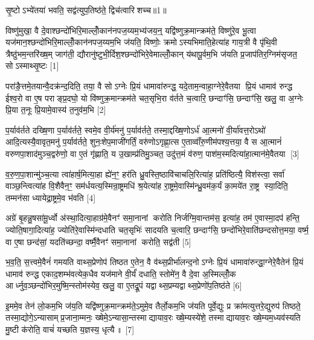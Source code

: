 {\scriptsize {सृ॒ष्टोऽभ्ये॑तया॑ भवति॒ सद्व॑त्युप॒तिष्ठ॑ते॒ द्विच॑त्वारिशच्च॥1॥}}

विष्णु॑मुखा॒ वै दे॒वाश्छन्दो॑भिरि॒माल्लोँ॒कान॑नपज॒य्यम॒भ्य॑जय॒न्॒ यद्वि॑ष्णुक्र॒मान्क्रम॑ते॒ विष्णु॑रे॒व भू॒त्वा यज॑मान॒श्छन्दो॑भिरि॒माल्लोँ॒कान॑नपज॒य्यम॒भि ज॑यति॒ विष्णोः॒ क्रमोऽस्यभिमाति॒हेत्या॑ह गाय॒त्री वै पृ॑थि॒वी त्रैष्ठु॑भम॒न्तरि॑ख्ष॒म् जाग॑ती॒ द्यौरानु॑ष्टुभी॒र्दिश॒श्छन्दो॑भिरे॒वेमाल्लोँ॒कान् य॑थापू॒र्वम॒भि ज॑यति प्र॒जाप॑तिर॒ग्निम॑सृजत॒ सोऽस्माथ्सृ॒ष्टः [1]

परा॑ङै॒त्तमे॒तयान्वै॒दक्र॑न्द॒दिति॒ तया॒ वै सोऽग्नेः प्रि॒यं धामावा॑रुन्द्ध॒ यदे॒ताम॒न्वाहा॒ग्नेरे॒वैतया प्रि॒यं धामाव॑ रुन्द्ध ईश्व॒रो वा ए॒ष पराङ्प्र॒दघो॒ यो वि॑ष्णुक्र॒मान्क्रम॑ते चत॒सृभि॒रा व॑र्तते च॒त्वारि॒ छन्दाꣳ॑सि॒ छन्दाꣳ॑सि॒ खलु॒ वा अ॒ग्नेः प्रि॒या त॒नूः प्रि॒यामे॒वास्य॑ त॒नुव॑म॒भि [2]

प॒र्याव॑र्तते दख्षि॒णा प॒र्याव॑र्तते॒ स्वमे॒व वी॒र्य॑मनु॑ प॒र्याव॑र्तते॒ तस्मा॒द्दख्षि॒णोऽर्ध॑ आ॒त्मनो॑ वी॒र्या॑वत्त॒रोऽथो॑ आदि॒त्यस्यै॒वावृत॒मनु॑ प॒र्याव॑र्तते॒ शुनः॒शेप॒माजी॑गर्तिं॒ वरु॑णोऽगृह्णा॒त्स ए॒ताव्वाँ॑रु॒णीम॑पश्य॒त्तया॒ वै स आ॒त्मानं॑ वरुणपा॒शाद॑मुञ्च॒द्वरु॑णो॒ वा ए॒तं गृ॑ह्णाति॒ य उ॒खाम्प्र॑तिमु॒ञ्चत॒ उदु॑त्त॒मं व॑रुण॒ पाश॑म॒स्मदित्या॑हा॒त्मान॑मे॒वैतया [3]

व॒रु॒ण॒पा॒शान्मु॑ञ्च॒त्या त्वा॑हार्\mbox{}ष॒मित्या॒हा ह्ये॑न॒ꣳ॒ हर॑ति ध्रु॒वस्ति॒ष्ठावि॑चाचलि॒रित्या॑ह॒ प्रति॑ष्ठित्यै॒ विश॑स्त्वा॒ सर्वा॑ वाञ्छ॒न्त्वित्या॑ह वि॒शैवैन॒ꣳ॒ सम॑र्धयत्य॒स्मिन्रा॒ष्ट्रमधि॑ श्र॒येत्या॑ह रा॒ष्ट्रमे॒वास्मि॑न्ध्रु॒वम॑क॒र्यं का॒मये॑त रा॒ष्ट्र स्या॒दिति॒ तम्मन॑सा ध्यायेद्रा॒ष्ट्रमे॒व भ॑वति [4]

अग्रे॑ बृ॒हन्नु॒षसा॑मू॒र्ध्वो अ॑स्था॒दित्या॒हाग्र॑मे॒वैनꣳ॑ समा॒नानां करोति निर्जग्मि॒वान्तम॑स॒ इत्या॑ह॒ तम॑ ए॒वास्मा॒दप॑ हन्ति॒ ज्योति॒षागा॒दित्या॑ह॒ ज्योति॑रे॒वास्मि॑न्दधाति चत॒सृभिः॑ सादयति च॒त्वारि॒ छन्दाꣳ॑सि॒ छन्दो॑भिरे॒वाति॑छन्दसोत्त॒मया॒ वर्ष्म॒ वा ए॒षा छन्द॑सां॒ यदति॑च्छन्दा॒ वर्ष्मै॒वैनꣳ॑ समा॒नानां करोति॒ सद्व॑ती [5]

भ॒व॒ति॒ स॒त्त्वमे॒वैनं॑ गमयति वाथ्स॒प्रेणोप॑ तिष्ठत ए॒तेन॒ वै व॑थ्स॒प्रीर्भा॑लन्द॒नोऽग्नेः प्रि॒यं धामावा॑रुन्द्धा॒ग्नेरे॒वैतेन॑ प्रि॒यं धामाव॑ रुन्द्ध एकाद॒शम्भ॑वत्येक॒धैव यज॑माने वी॒र्यं॑ दधाति॒ स्तोमे॑न॒ वै दे॒वा अ॒स्मिल्लोँ॒क आर्ध्नुव॒ञ्छन्दो॑भिर॒मुष्मि॒न्स्तोम॑स्येव॒ खलु॒ वा ए॒तद्रू॒पं यद्वाथ्स॒प्रम्यद्वाथ्स॒प्रेणो॑प॒तिष्ठ॑ते [6]

इ॒ममे॒व तेन॑ लो॒कम॒भि ज॑य॒ति यद्वि॑ष्णुक्र॒मान्क्रम॑ते॒ऽमुमे॒व तैर्लो॒कम॒भि ज॑यति पूर्वे॒द्युः प्र क्रा॑मत्युत्तरे॒द्युरुप॑ तिष्ठते॒ तस्मा॒द्योगे॒ऽन्यासाम्प्र॒जाना॒म्मनः॒ ख्षेमे॒ऽन्यासा॒न्तस्माद्यायाव॒रः ख्षे॒म्यस्ये॑शे॒ तस्माद्यायाव॒रः ख्षे॒म्यम॒ध्यव॑स्यति मु॒ष्टी क॑रोति॒ वाचं॑ यच्छति य॒ज्ञस्य॒ धृत्यै॥ [7]

